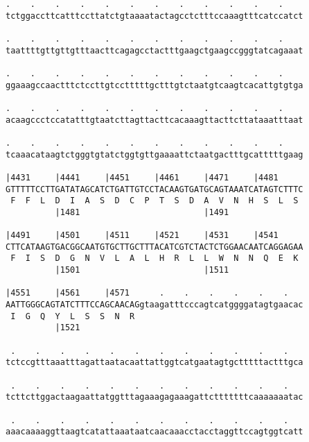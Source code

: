 \documentclass{article}
\begin{document}
\begin{Verbatim}
.    .    .    .    .    .    .    .    .    .    .    .    
tctggaccttcatttccttatctgtaaaatactagcctctttccaaagtttcatccatct
                                                            
.    .    .    .    .    .    .    .    .    .    .    .    
taattttgttgttgtttaacttcagagcctactttgaagctgaagccgggtatcagaaat
                                                            
.    .    .    .    .    .    .    .    .    .    .    .    
ggaaagccaactttctccttgtcctttttgctttgtctaatgtcaagtcacattgtgtga
                                                            
.    .    .    .    .    .    .    .    .    .    .    .    
acaagccctccatatttgtaatcttagttacttcacaaagttacttcttataaatttaat
                                                            
.    .    .    .    .    .    .    .    .    .    .    .    
tcaaacataagtctgggtgtatctggtgttgaaaattctaatgactttgcatttttgaag
                                                            
|4431     |4441     |4451     |4461     |4471     |4481     
GTTTTTCCTTGATATAGCATCTGATTGTCCTACAAGTGATGCAGTAAATCATAGTCTTTC
 F  F  L  D  I  A  S  D  C  P  T  S  D  A  V  N  H  S  L  S 
          |1481                         |1491               
  
|4491     |4501     |4511     |4521     |4531     |4541     
CTTCATAAGTGACGGCAATGTGCTTGCTTTACATCGTCTACTCTGGAACAATCAGGAGAA
 F  I  S  D  G  N  V  L  A  L  H  R  L  L  W  N  N  Q  E  K 
          |1501                         |1511               
  
|4551     |4561     |4571      .    .    .    .    .    .   
AATTGGGCAGTATCTTTCCAGCAACAGgtaagatttcccagtcatggggatagtgaacac
 I  G  Q  Y  L  S  S  N  R                                  
          |1521                                             
  
 .    .    .    .    .    .    .    .    .    .    .    .   
tctccgtttaaatttagattaatacaattattggtcatgaatagtgctttttactttgca
                                                            
 .    .    .    .    .    .    .    .    .    .    .    .   
tcttcttggactaagaattatggtttagaaagagaaagattctttttttcaaaaaaatac
                                                            
 .    .    .    .    .    .    .    .    .    .    .    .   
aaacaaaaggttaagtcatattaaataatcaacaaacctacctaggttccagtggtcatt
                                                            

\end{Verbatim}
\end{document}

